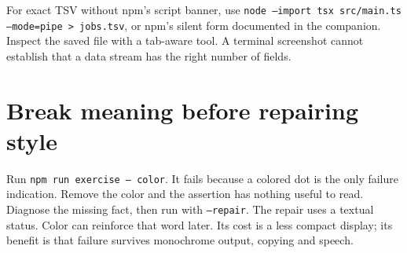 For exact TSV without npm's script banner, use \texttt{node --import tsx src/main.ts --mode=pipe > jobs.tsv}, or npm's silent form documented in the companion. Inspect the saved file with a tab-aware tool. A terminal screenshot cannot establish that a data stream has the right number of fields.

\section{Break meaning before repairing style}

Run \texttt{npm run exercise -- color}. It fails because a colored dot is the only failure indication. Remove the color and the assertion has nothing useful to read. Diagnose the missing fact, then run with \texttt{--repair}. The repair uses a textual status. Color can reinforce that word later. Its cost is a less compact display; its benefit is that failure survives monochrome output, copying and speech.
